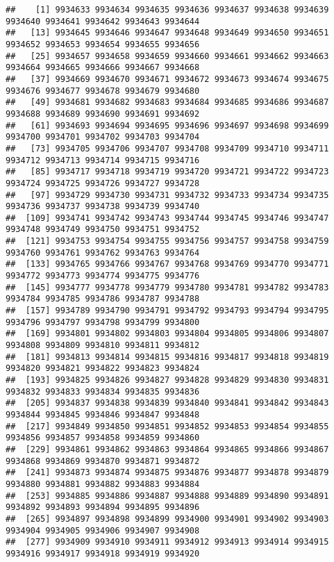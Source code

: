 \documentclass[
]{article}
\begin{document}
\begin{verbatim}
##    [1] 9934633 9934634 9934635 9934636 9934637 9934638 9934639 9934640 9934641 9934642 9934643 9934644
##   [13] 9934645 9934646 9934647 9934648 9934649 9934650 9934651 9934652 9934653 9934654 9934655 9934656
##   [25] 9934657 9934658 9934659 9934660 9934661 9934662 9934663 9934664 9934665 9934666 9934667 9934668
##   [37] 9934669 9934670 9934671 9934672 9934673 9934674 9934675 9934676 9934677 9934678 9934679 9934680
##   [49] 9934681 9934682 9934683 9934684 9934685 9934686 9934687 9934688 9934689 9934690 9934691 9934692
##   [61] 9934693 9934694 9934695 9934696 9934697 9934698 9934699 9934700 9934701 9934702 9934703 9934704
##   [73] 9934705 9934706 9934707 9934708 9934709 9934710 9934711 9934712 9934713 9934714 9934715 9934716
##   [85] 9934717 9934718 9934719 9934720 9934721 9934722 9934723 9934724 9934725 9934726 9934727 9934728
##   [97] 9934729 9934730 9934731 9934732 9934733 9934734 9934735 9934736 9934737 9934738 9934739 9934740
##  [109] 9934741 9934742 9934743 9934744 9934745 9934746 9934747 9934748 9934749 9934750 9934751 9934752
##  [121] 9934753 9934754 9934755 9934756 9934757 9934758 9934759 9934760 9934761 9934762 9934763 9934764
##  [133] 9934765 9934766 9934767 9934768 9934769 9934770 9934771 9934772 9934773 9934774 9934775 9934776
##  [145] 9934777 9934778 9934779 9934780 9934781 9934782 9934783 9934784 9934785 9934786 9934787 9934788
##  [157] 9934789 9934790 9934791 9934792 9934793 9934794 9934795 9934796 9934797 9934798 9934799 9934800
##  [169] 9934801 9934802 9934803 9934804 9934805 9934806 9934807 9934808 9934809 9934810 9934811 9934812
##  [181] 9934813 9934814 9934815 9934816 9934817 9934818 9934819 9934820 9934821 9934822 9934823 9934824
##  [193] 9934825 9934826 9934827 9934828 9934829 9934830 9934831 9934832 9934833 9934834 9934835 9934836
##  [205] 9934837 9934838 9934839 9934840 9934841 9934842 9934843 9934844 9934845 9934846 9934847 9934848
##  [217] 9934849 9934850 9934851 9934852 9934853 9934854 9934855 9934856 9934857 9934858 9934859 9934860
##  [229] 9934861 9934862 9934863 9934864 9934865 9934866 9934867 9934868 9934869 9934870 9934871 9934872
##  [241] 9934873 9934874 9934875 9934876 9934877 9934878 9934879 9934880 9934881 9934882 9934883 9934884
##  [253] 9934885 9934886 9934887 9934888 9934889 9934890 9934891 9934892 9934893 9934894 9934895 9934896
##  [265] 9934897 9934898 9934899 9934900 9934901 9934902 9934903 9934904 9934905 9934906 9934907 9934908
##  [277] 9934909 9934910 9934911 9934912 9934913 9934914 9934915 9934916 9934917 9934918 9934919 9934920

\end{verbatim}
\end{document}
